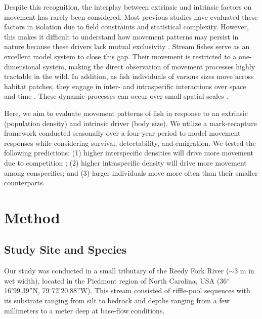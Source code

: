 \documentclass[11pt, class=article, crop=false]{standalone}
\begin{document}
Despite this recognition, the interplay between extrinsic and intrinsic factors on movement has rarely been considered. Most previous studies have evaluated these factors in isolation due to field constraints and statistical complexity. However, this makes it difficult to understand how movement patterns may persist in nature because these drivers lack mutual exclusivity \citep{mcmahonLinkingHabitatSelection2006}. Stream fishes serve as an excellent model system to close this gap. Their movement is restricted to a one-dimensional system, making the direct observation of movement processes highly tractable in the wild. In addition, as fish individuals of various sizes move across habitat patches, they engage in inter- and intraspecific interactions over space and time \citep{brownHabitatHeterogeneityActivity2010, davidsonSeasonalSpatialHydrological2012, robinsonEffectsMultiyearExperimental2003, albaneseEcologicalCorrelatesFish2004, nakayamaFinescaleMovementEcology2018, pettyRestrictedMovementMottled2004, robertsSpatiotemporalVariabilityStream2007}. These dynamic processes can occur over small spatial scales \citep{teruiNonrandomDispersalSympatric2021}. 

Here, we aim to evaluate movement patterns of fish in response to an extrinsic (population density) and intrinsic driver (body size). We utilize a mark-recapture framework conducted seasonally over a four-year period to model movement responses while considering survival, detectability, and emigration. We tested the following predictions: (1) higher interspecific densities will drive more movement due to competition ; (2) higher intraspecific density will drive more movement among conspecifics; and (3) larger individuals move more often than their smaller counterparts.

\section{Method}

\subsection{Study Site and Species}

Our study was conducted in a small tributary of the Reedy Fork River ($\sim$3 m in wet width), located in the Piedmont region of North Carolina, USA (36$^\circ$16’99.39”N, 79$^\circ$72’20.88”W). This stream consisted of riffle-pool sequences with its substrate ranging from silt to bedrock and depths ranging from a few millimeters to a meter deep at base-flow conditions. 
\end{document}
